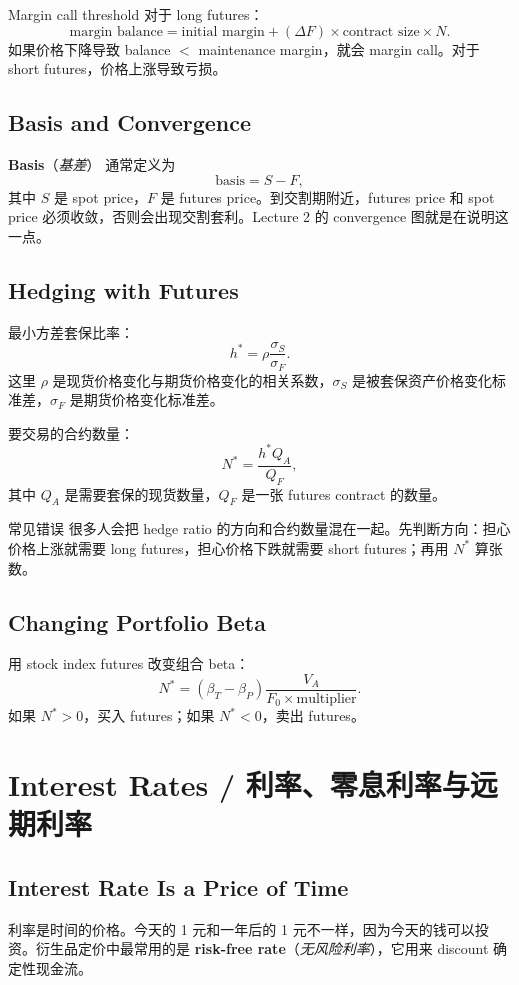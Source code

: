 \documentclass[11pt,a4paper,openany]{ctexbook}
\newcommand{\term}[2]{\textbf{#1}（\emph{#2}）}
\newcommand{\source}[1]{\par\smallskip\noindent{\small\textcolor{muted}{Source: #1}}\par}
\begin{document}
\begin{formulabox}{Margin call threshold}
对于 long futures：
\[
\text{margin balance}=\text{initial margin}+(\Delta F)\times \text{contract size}\times N.
\]
如果价格下降导致 balance $<$ maintenance margin，就会 margin call。对于 short futures，价格上涨导致亏损。
\end{formulabox}

\section{Basis and Convergence}
\term{Basis}{基差} 通常定义为
\[
\text{basis}=S-F,
\]
其中 $S$ 是 spot price，$F$ 是 futures price。到交割期附近，futures price 和 spot price 必须收敛，否则会出现交割套利。Lecture 2 的 convergence 图就是在说明这一点。

\section{Hedging with Futures}
最小方差套保比率：
\[
h^\ast=\rho\frac{\sigma_S}{\sigma_F}.
\]
这里 $\rho$ 是现货价格变化与期货价格变化的相关系数，$\sigma_S$ 是被套保资产价格变化标准差，$\sigma_F$ 是期货价格变化标准差。

要交易的合约数量：
\[
N^\ast=\frac{h^\ast Q_A}{Q_F},
\]
其中 $Q_A$ 是需要套保的现货数量，$Q_F$ 是一张 futures contract 的数量。

\begin{warningbox}{常见错误}
很多人会把 hedge ratio 的方向和合约数量混在一起。先判断方向：担心价格上涨就需要 long futures，担心价格下跌就需要 short futures；再用 $N^\ast$ 算张数。
\end{warningbox}

\section{Changing Portfolio Beta}
用 stock index futures 改变组合 beta：
\[
N^\ast=(\beta_T-\beta_P)\frac{V_A}{F_0\times \text{multiplier}}.
\]
如果 $N^\ast>0$，买入 futures；如果 $N^\ast<0$，卖出 futures。

\chapter{Interest Rates / 利率、零息利率与远期利率}
\source{Lecture 3; Lecture 4; Assignment 1}

\section{Interest Rate Is a Price of Time}
利率是时间的价格。今天的 1 元和一年后的 1 元不一样，因为今天的钱可以投资。衍生品定价中最常用的是 \term{risk-free rate}{无风险利率}，它用来 discount 确定性现金流。
\end{document}

